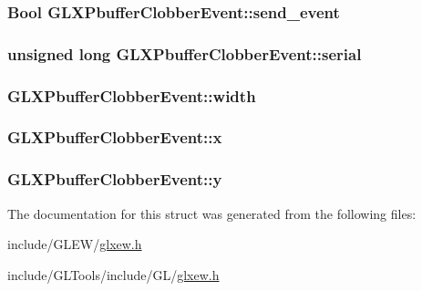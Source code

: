 \hypertarget{struct_g_l_x_pbuffer_clobber_event_aa51969e67e4ad6095bda26ca64fe8ba6}{
\subsubsection[{send\-\_\-event}]{\setlength{\rightskip}{0pt plus 5cm}Bool G\-L\-X\-Pbuffer\-Clobber\-Event\-::send\-\_\-event}}\label{struct_g_l_x_pbuffer_clobber_event_aa51969e67e4ad6095bda26ca64fe8ba6}
\hypertarget{struct_g_l_x_pbuffer_clobber_event_a6390b2875ae06a4cb827d2b4c321eda3}{
\subsubsection[{serial}]{\setlength{\rightskip}{0pt plus 5cm}unsigned long G\-L\-X\-Pbuffer\-Clobber\-Event\-::serial}}\label{struct_g_l_x_pbuffer_clobber_event_a6390b2875ae06a4cb827d2b4c321eda3}
\hypertarget{struct_g_l_x_pbuffer_clobber_event_aaca375fecb872c73c60cd5d0bfc7c7a5}{
\subsubsection[{width}]{ G\-L\-X\-Pbuffer\-Clobber\-Event\-::width}}\label{struct_g_l_x_pbuffer_clobber_event_aaca375fecb872c73c60cd5d0bfc7c7a5}
\hypertarget{struct_g_l_x_pbuffer_clobber_event_a8f0a7162a033c89ee94ce535580dbc32}{
\subsubsection[{x}]{ G\-L\-X\-Pbuffer\-Clobber\-Event\-::x}}\label{struct_g_l_x_pbuffer_clobber_event_a8f0a7162a033c89ee94ce535580dbc32}
\hypertarget{struct_g_l_x_pbuffer_clobber_event_a69eb7ac60d36ac3ec4550ac206cfc61f}{
\subsubsection[{y}]{ G\-L\-X\-Pbuffer\-Clobber\-Event\-::y}}\label{struct_g_l_x_pbuffer_clobber_event_a69eb7ac60d36ac3ec4550ac206cfc61f}


The documentation for this struct was generated from the following files\-:\begin{DoxyCompactItemize}
\item 
include/\-G\-L\-E\-W/\hyperlink{_g_l_e_w_2glxew_8h}{glxew.\-h}\item 
include/\-G\-L\-Tools/include/\-G\-L/\hyperlink{_g_l_tools_2include_2_g_l_2glxew_8h}{glxew.\-h}\end{DoxyCompactItemize}
